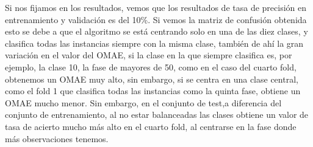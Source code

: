 Si nos fijamos en los resultados, vemos que los resultados de tasa de precisión en entrenamiento y validación es del 10\%. Si vemos la matriz de confusión obtenida esto se debe a que el algoritmo se está centrando solo en una de las diez clases, y clasifica todas las instancias siempre con la misma clase, también de ahí la gran variación en el valor del OMAE, si la clase en la que siempre clasifica es, por ejemplo, la clase 10, la fase de mayores de 50, como en el caso del cuarto fold, obtenemos un OMAE muy alto, sin embargo, si se centra en una clase central, como el fold 1 que clasifica todas las instancias como la quinta fase, obtiene un OMAE mucho menor. Sin embargo, en el conjunto de test,a diferencia del conjunto de entrenamiento, al no estar balanceadas las clases obtiene un valor de tasa de acierto mucho más alto en el cuarto fold, al centrarse en la fase donde más observaciones tenemos.


